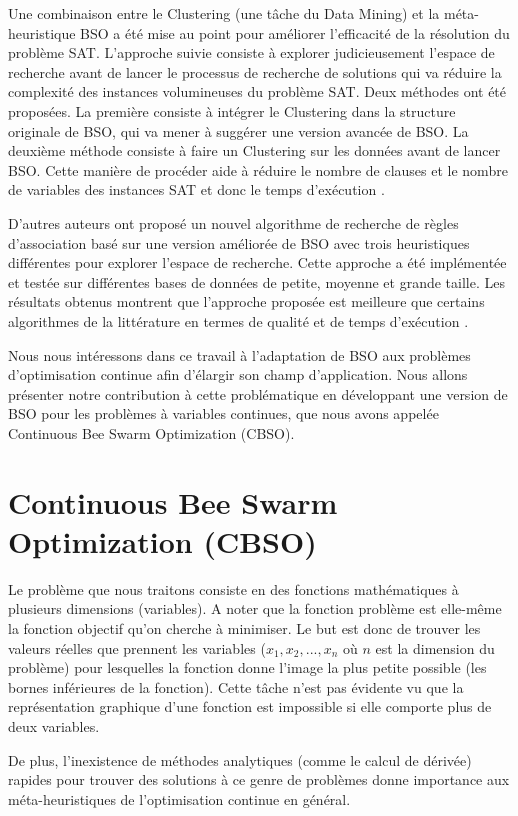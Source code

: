 Une combinaison entre le Clustering (une tâche du Data Mining) et la méta-heuristique BSO a été mise au point pour améliorer l’efficacité de la résolution du problème
SAT. L’approche suivie consiste à explorer judicieusement l’espace de
recherche avant de lancer le processus de recherche de solutions qui va
réduire la complexité des instances volumineuses du problème SAT. Deux
méthodes ont été proposées. La première consiste à intégrer le Clustering
dans la structure originale de BSO, qui va mener à suggérer une version
avancée de BSO. La deuxième méthode consiste à faire un Clustering sur
les données avant de lancer BSO. Cette manière de procéder aide à
réduire le nombre de clauses et le nombre de variables des instances SAT
et donc le temps d'exécution \cite{DRIAS_DOUIB_HIRECHE_2013}.

D'autres auteurs ont proposé un nouvel algorithme de
recherche de règles d'association basé sur une version améliorée de BSO
avec trois heuristiques différentes pour explorer l'espace de recherche.
Cette approche a été implémentée et testée sur différentes bases de
données de petite, moyenne et grande taille. Les résultats obtenus
montrent que l'approche proposée est meilleure que certains algorithmes
de la littérature en termes de qualité et de temps d'exécution \cite{DJENOURI_DRIAS_HABBAS_2014}.

Nous nous intéressons dans ce travail à l'adaptation de BSO aux problèmes d'optimisation continue afin d'élargir son champ d'application. Nous allons présenter notre contribution à cette problématique en développant une version de BSO pour les problèmes à variables continues, que nous avons appelée Continuous Bee Swarm Optimization (CBSO).

\section{Continuous Bee Swarm Optimization (CBSO)}
Le problème que nous traitons consiste en des fonctions
mathématiques à plusieurs dimensions (variables). A noter que la fonction problème est elle-même la fonction objectif qu'on cherche à minimiser. Le but est donc de trouver les valeurs réelles que prennent les variables ($x_1, x_2,..., x_n$ où $n$ est la dimension du problème) pour lesquelles la fonction donne l'image la plus petite possible (les bornes inférieures de la fonction). Cette tâche n'est pas évidente vu que la représentation graphique d'une fonction est impossible si elle comporte plus de deux variables.

De plus, l'inexistence de méthodes analytiques (comme le calcul de dérivée) rapides pour trouver des solutions à ce genre de problèmes donne importance aux méta-heuristiques de l'optimisation continue en général.\\

